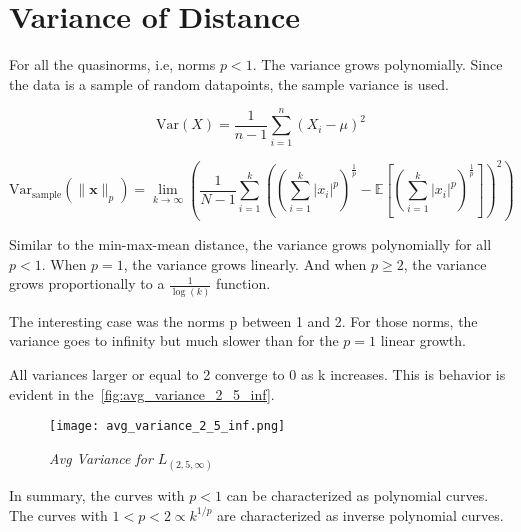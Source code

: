 
\section{Variance of Distance}\label{sec:variance}


For all the quasinorms, i.e, norms $p < 1$. The variance grows polynomially. Since the data is a sample of random datapoints, the sample variance is used.

\[
    \text{Var}(X) = \frac{1}{n -1 } \sum_{i=1}^{n} \left(X_i - \mu \right)^2
\]


\begin{equation}
    \text{Var}_{\text{sample}}\left(\|\mathbf{x}\|_p\right) = \lim_{k \to \infty} \left( \frac{1}{N - 1} \sum_{i=1}^{k} \left( \left( \sum_{i=1}^{k} |x_i|^p \right)^{\frac{1}{p}} - \mathbb{E}\left[\left( \sum_{i=1}^{k} |x_i|^p \right)^{\frac{1}{p}}\right] \right)^2 \right)
\end{equation}

Similar to the min-max-mean distance, the variance grows polynomially for all \(p < 1\). When \(p = 1\), the variance grows linearly. And when \(p \geq 2\), the variance grows proportionally to a \(\frac{1}{\log(k)}\) function.

The interesting case was the norms p between 1 and 2. For those norms, the variance goes to infinity but much slower than for the \(p=1\) linear growth.

All variances larger or equal to 2 converge to 0 as k increases. This is behavior is evident in the~\autoref{fig:avg_variance_2_5_inf}.



\begin{figure}[ht!]
    \centering
    \texttt{[image: avg\_variance\_2\_5\_inf.png]}
    \caption{\emph{Avg Variance for \(L_{(2,5,\infty)}\)}}
    \label{fig:avg_variance_2_5_inf}
\end{figure}



In summary, the curves with $p < 1$ can be characterized as polynomial curves. The curves with $ 1 < p < 2 \propto k^{1/p}$ are characterized as inverse polynomial curves.

